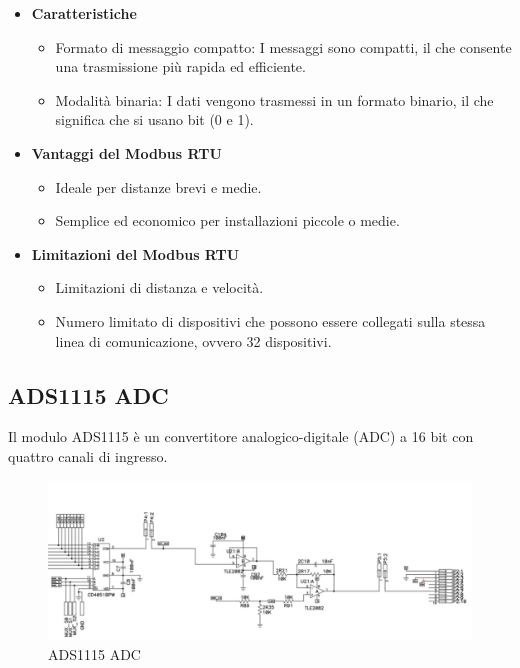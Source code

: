 \documentclass[12pt,a4paper]{report}
\begin{document}
\begin{itemize}
    \item \textbf{Caratteristiche}
    \begin{itemize}
        \item Formato di messaggio compatto: I messaggi sono compatti, il che consente una trasmissione più rapida ed efficiente.
        \item Modalità binaria: I dati vengono trasmessi in un formato binario, il che significa che si usano bit (0 e 1).
    \end{itemize}
    \item \textbf{Vantaggi del Modbus RTU}
    \begin{itemize}
        \item Ideale per distanze brevi e medie.
        \item Semplice ed economico per installazioni piccole o medie.
    \end{itemize}
    \item \textbf{Limitazioni del Modbus RTU}
    \begin{itemize}
        \item Limitazioni di distanza e velocità.
        \item Numero limitato di dispositivi che possono essere collegati sulla stessa linea di comunicazione, ovvero 32 dispositivi.
    \end{itemize}
\end{itemize}

\newpage

\subsection{ADS1115 ADC}
Il modulo ADS1115 è un convertitore analogico-digitale (ADC) a 16 bit con quattro canali di ingresso.

\begin{figure}[H]
    \centering
    \includegraphics[width=\linewidth]{../image/ADC.png}
    \caption{ADS1115 ADC}
\end{figure}
\end{document}
